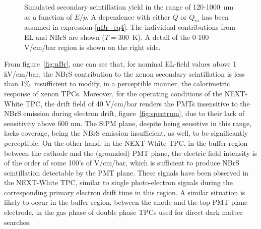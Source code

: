 \documentclass[%
 reprint,
superscriptaddress,
 amsmath,amssymb,
 aps,
]{revtex4-2}
\begin{document}
\begin{figure}[tbp]
\caption{\label{fig:produced}Simulated secondary scintillation yield in the range of 120-1000~nm as a function of $E/p$. A dependence with either $Q$ or $Q_m$ has been assumed in expression \ref{nBr_eq4}. The individual contributions from EL and NBrS are shown ($T=300$~K). A detail of the 0-100 V/cm/bar region is shown on the right side.}
\end{figure}

From figure~\ref{fig:nBr}, one can see that, for nominal EL-field values above 1 kV/cm/bar, the NBrS contribution to the xenon secondary scintillation is less than 1\%, insufficient to modify, in a perceptible manner, the calorimetric response of xenon TPCs. Moreover, for the operating conditions of the NEXT-White TPC, the drift field of 40 V/cm/bar renders the PMTs insensitive to the NBrS emission during electron drift, figure~\ref{fig:spectrum}, due to their lack of sensitivity above 600 nm. The SiPM plane, despite being sensitive in this range, lacks coverage, being the NBrS emission insufficient, as well, to be significantly perceptible. On the other hand, in the NEXT-White TPC, in the buffer region between the cathode and the (grounded) PMT plane, the electric field intensity is of the order of some 100’s of V/cm/bar, which is sufficient to produce NBrS scintillation detectable by the PMT plane. These signals have been observed in the NEXT-White TPC, similar to single photo-electron signals during the corresponding primary electron drift time in this region. A similar situation is likely to occur in the buffer region, between the anode and the top PMT plane electrode, in the gas phase of double phase TPCs used for direct dark matter searches.
\end{document}
